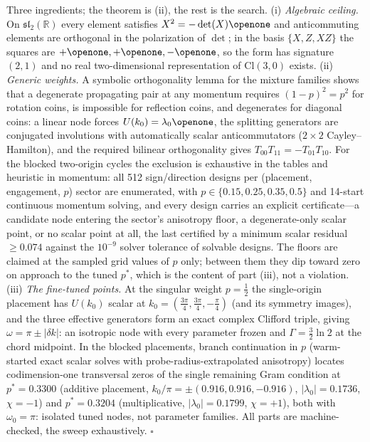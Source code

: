 \documentclass[aps,prd,twocolumn,superscriptaddress,nofootinbib,floatfix]{revtex4-2}
\begin{document}
Three ingredients; the theorem is (ii), the rest is the search.
(i) \emph{Algebraic ceiling.} On
$\mathfrak{sl}_2(\mathbb R)$ every element satisfies
$X^2=-\det(X)\openone$ and anticommuting elements are orthogonal in the
polarization of $\det$; in the basis $\{X,Z,XZ\}$ the squares are
$+\openone,+\openone,-\openone$, so the form has signature $(2,1)$ and no
real two-dimensional representation of $\mathrm{Cl}(3,0)$ exists.
(ii) \emph{Generic weights.} A symbolic orthogonality lemma for the
mixture families shows that a degenerate propagating pair at any momentum
requires $(1-p)^2=p^2$ for rotation coins, is impossible for reflection
coins, and degenerates for diagonal coins: a linear node forces
$U(k_0)=\lambda_0\openone$, the splitting generators are conjugated
involutions with automatically scalar anticommutators ($2\times2$
Cayley--Hamilton), and the required bilinear orthogonality gives
$T_{00}T_{11}=-T_{01}T_{10}$. For the blocked two-origin cycles the
exclusion is exhaustive in the tables and heuristic in momentum: all
512 sign/direction designs per (placement, engagement, $p$) sector are
enumerated, with $p\in\{0.15,0.25,0.35,0.5\}$ and 14-start continuous
momentum solving, and every design carries an explicit certificate---a
candidate node entering the sector's anisotropy floor, a
degenerate-only scalar point, or no scalar point at all, the last
certified by a minimum scalar residual $\ge0.074$ against the $10^{-9}$
solver tolerance of solvable designs. The floors are claimed at the
sampled grid values of $p$ only; between them they dip toward zero on
approach to the tuned $p^*$, which is the content of part (iii), not a
violation.
(iii) \emph{The fine-tuned points.} At the singular weight $p=\tfrac12$
the single-origin placement has $U(k_0)$ scalar at
$k_0=(\tfrac{3\pi}4,\tfrac{3\pi}4,-\tfrac\pi4)$ (and its symmetry
images), and the three effective generators form an exact complex
Clifford triple, giving $\omega=\pi\pm|\delta k|$: an isotropic node with
every parameter frozen and $\Gamma=\tfrac32\ln2$ at the chord midpoint.
In the blocked placements, branch continuation in $p$ (warm-started exact
scalar solves with probe-radius-extrapolated anisotropy) locates
codimension-one transversal zeros of the single remaining Gram condition
at $p^*=0.3300$ (additive placement,
$k_0/\pi=\pm(0.916,0.916,-0.916)$, $|\lambda_0|=0.1736$, $\chi=-1$) and
$p^*=0.3204$ (multiplicative, $|\lambda_0|=0.1799$, $\chi=+1$), both
with $\omega_0=\pi$: isolated tuned nodes, not parameter families. All parts are machine-checked, the sweep exhaustively.
\hfill$\square$
\end{document}

